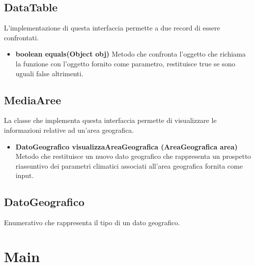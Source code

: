 \documentclass[a4paper, 12pt]{report}
\begin{document}
			\subsection{DataTable}
			L'implementazione di questa interfaccia permette a due record di essere confrontati.
			\begin{itemize}
				\item\textbf{boolean equals(Object obj)}
				Metodo che confronta l'oggetto che richiama la funzione con l'oggetto fornito come parametro, restituisce true se sono uguali false altrimenti.
			\end{itemize}
			\subsection{MediaAree}
			La classe che implementa questa interfaccia permette di visualizzare le informazioni relative ad un'area geografica.
			\begin{itemize}
				\item\textbf {DatoGeografico visualizzaAreaGeografica (AreaGeografica area)} Metodo che restituisce un nuovo dato geografico che rappresenta un prospetto riassuntivo dei parametri climatici associati all'area geografica fornita come input.
			\end{itemize}
			\subsection{DatoGeografico}
			Enumerativo che rappresenta il tipo di un dato geografico.


		\section{Main}

	
\end{document}
